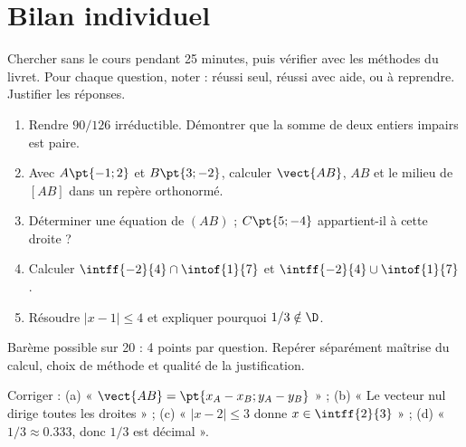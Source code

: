 \section{Bilan individuel}
\begin{method}[Consigne]
Chercher sans le cours pendant 25 minutes, puis vérifier avec les méthodes du livret. Pour chaque question, noter : réussi seul, réussi avec aide, ou à reprendre. Justifier les réponses.
\end{method}
\begin{example}\begin{enumerate}
\item Rendre $90/126$ irréductible. Démontrer que la somme de deux entiers impairs est paire.
\item Avec $A\pt{-1;2}$ et $B\pt{3;-2}$, calculer $\vect{AB}$, $AB$ et le milieu de $[AB]$ dans un repère orthonormé.
\item Déterminer une équation de $(AB)$ ; $C\pt{5;-4}$ appartient-il à cette droite ?
\item Calculer $\intff{-2}{4}\cap\intof{1}{7}$ et $\intff{-2}{4}\cup\intof{1}{7}$.
\item Résoudre $|x-1|\leq4$ et expliquer pourquoi $1/3\notin\D$.
\end{enumerate}\end{example}
\begin{teachernote}Barème possible sur 20 : 4 points par question. Repérer séparément maîtrise du calcul, choix de méthode et qualité de la justification.\end{teachernote}
\begin{example}Corriger : (a) « $\vect{AB}=\pt{x_A-x_B;y_A-y_B}$ » ; (b) « Le vecteur nul dirige toutes les droites » ; (c) « $|x-2|\leq3$ donne $x\in\intff{2}{3}$ » ; (d) « $1/3\approx\num{0,333}$, donc $1/3$ est décimal ».\end{example}
